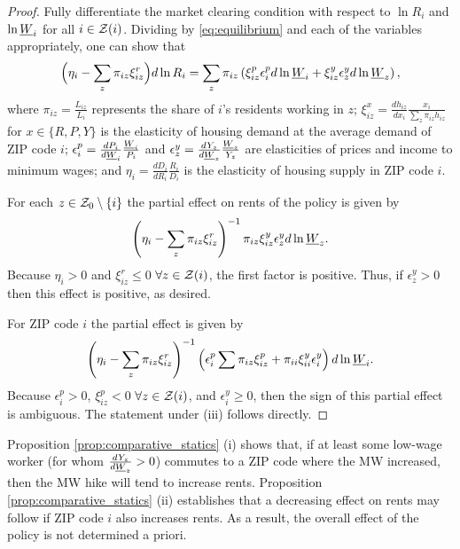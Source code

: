 \begin{proof}
    Fully differentiate the market clearing condition with respect to $\ln R_i$ 
    and $\ln \underline{W}_i$ for all $i\in\mathcal{Z}(i)$.
    Dividing by \ref{eq:equilibrium} and each of the variables appropriately, 
    one can show that
    \begin{equation}\label{eq:diff_equilibrium}
        \Big(\eta_i - \sum_z \pi_{iz} \xi^r_{iz} \Big) d \ln R_i
        = 
        \sum_z \pi_{iz} \left(\xi^p_{iz} \epsilon_{i}^p d \ln \underline{W}_i 
                            + \xi^y_{iz} \epsilon_{z}^y d \ln \underline{W}_z \right) ,
    \end{equation}
    where
    $\pi_{iz} = \frac{L_{iz}}{L_i}$ represents the share of $i$'s residents 
    working in $z$;
    $\xi_{iz}^x = \frac{d h_{iz}}{d x_i} \frac{x_i}{\sum_z \pi_{iz} h_{iz}}$ for
    $x\in\{R,P,Y\}$ is the elasticity of housing demand at the average demand of
    ZIP code $i$;
    $\epsilon_{i}^p = \frac{d P_i}{d \underline{W}_i} \frac{\underline{W}_i}{P_i}$ and 
    $\epsilon_{z}^y = \frac{d Y_z}{d \underline{W}_z} \frac{\underline{W}_z}{Y_z}$ are
    elasticities of prices and income to minimum wages; and
    $\eta_i = \frac{d D_i}{d R_i} \frac{R_i}{D_i}$ is the elasticity 
    of housing supply in ZIP code $i$.

    For each $z\in\mathcal{Z}_0\setminus\{i\}$ the partial effect on rents of the policy
    is given by 
    $$\left(\eta_i - \sum_z \pi_{iz} \xi^r_{iz}\right)^{-1} 
      \pi_{iz}\xi^y_{iz}\epsilon_{z}^y d\ln\underline{W}_z.$$
    Because $\eta_i>0$ and $\xi^r_{iz}\leq 0$  $\forall z\in\mathcal{Z}(i)$, the first 
    factor is positive.
    Thus, if $\epsilon_{z}^y>0$ then this effect is positive, as desired.

    For ZIP code $i$ the partial effect is given by
    $$\left(\eta_i - \sum_z \pi_{iz} \xi^r_{iz}\right)^{-1} 
      \left(\epsilon_{i}^p \sum \pi_{iz}\xi^p_{iz} 
            + \pi_{ii}\xi^y_{ii}\epsilon_i^y \right)d\ln\underline{W}_i.$$
    Because $\epsilon_{i}^p>0$, $\xi^p_{iz}<0$ $\forall z\in\mathcal{Z}(i)$,
    and $\epsilon_{i}^y\geq0$, 
    then the sign of this partial effect is ambiguous.
    The statement under (iii) follows directly.
\end{proof}

Proposition \ref{prop:comparative_statics} (i) shows that, 
if at least some low-wage worker (for whom $\frac{d Y_z}{d \underline{W}_z}>0$) 
commutes to a ZIP code where the MW increased, 
then the MW hike will tend to increase rents.
Proposition \ref{prop:comparative_statics} (ii) establishes that a decreasing
effect on rents may follow if ZIP code $i$ also increases rents.
As a result, the overall effect of the policy is not determined a priori.

